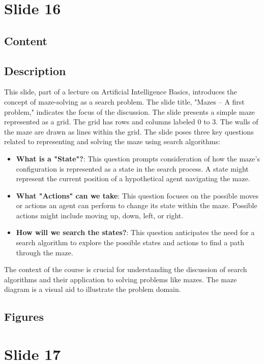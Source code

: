 \documentclass{article}%
\begin{document}
%
\newpage%
\section{Slide 16}%
\label{sec:Slide16}%
\subsection{Content}%
%
\subsection{Description}%
This slide, part of a lecture on Artificial Intelligence Basics, introduces the concept of maze-solving as a search problem.  The slide title, "Mazes – A first problem," indicates the focus of the discussion.  The slide presents a simple maze represented as a grid.  The grid has rows and columns labeled 0 to 3.  The walls of the maze are drawn as lines within the grid.  The slide poses three key questions related to representing and solving the maze using search algorithms:
\begin{itemize}
    \item \textbf{What is a "State"?}:  This question prompts consideration of how the maze's configuration is represented as a state in the search process.  A state might represent the current position of a hypothetical agent navigating the maze.
    \item \textbf{What "Actions" can we take}: This question focuses on the possible moves or actions an agent can perform to change its state within the maze.  Possible actions might include moving up, down, left, or right.
    \item \textbf{How will we search the states?}: This question anticipates the need for a search algorithm to explore the possible states and actions to find a path through the maze.
\end{itemize}
The context of the course is crucial for understanding the discussion of search algorithms and their application to solving problems like mazes. The maze diagram is a visual aid to illustrate the problem domain.%
\subsection{Figures}%
\begin{figure}[H]%
\centering%
\end{figure}

%
\newpage%
\section{Slide 17}%
\label{sec:Slide17}%
\end{document}

